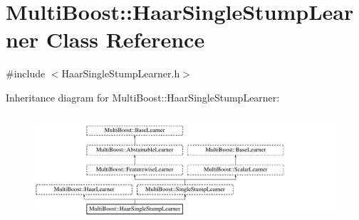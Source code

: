 \hypertarget{classMultiBoost_1_1HaarSingleStumpLearner}{
\section{MultiBoost::HaarSingleStumpLearner Class Reference}
\label{classMultiBoost_1_1HaarSingleStumpLearner}
}


{\ttfamily \#include $<$HaarSingleStumpLearner.h$>$}

Inheritance diagram for MultiBoost::HaarSingleStumpLearner:\begin{figure}[H]
\begin{center}
\leavevmode
\includegraphics[height=4.129794cm]{classMultiBoost_1_1HaarSingleStumpLearner}
\end{center}
\end{figure}
